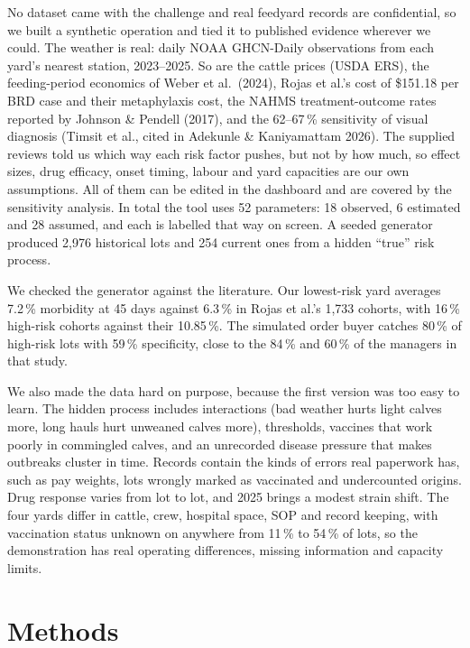 \documentclass[10pt,letterpaper]{article}
\newcommand{\pct}{\,\%}
\newcommand{\usd}[1]{\$#1}
\begin{document}
No dataset came with the challenge and real feedyard records are confidential, so we built a synthetic operation and tied it to published evidence wherever we could. The weather is real: daily NOAA GHCN-Daily observations from each yard's nearest station, 2023--2025. So are the cattle prices (USDA ERS), the feeding-period economics of Weber et al.\ (2024), Rojas et al.'s cost of \usd{151.18} per BRD case and their metaphylaxis cost, the NAHMS treatment-outcome rates reported by Johnson \& Pendell (2017), and the 62--67\pct{} sensitivity of visual diagnosis (Timsit et al., cited in Adekunle \& Kaniyamattam 2026). The supplied reviews told us which way each risk factor pushes, but not by how much, so effect sizes, drug efficacy, onset timing, labour and yard capacities are our own assumptions. All of them can be edited in the dashboard and are covered by the sensitivity analysis. In total the tool uses 52 parameters: 18 observed, 6 estimated and 28 assumed, and each is labelled that way on screen. A seeded generator produced 2,976 historical lots and 254 current ones from a hidden ``true'' risk process.

We checked the generator against the literature. Our lowest-risk yard averages 7.2\pct{} morbidity at 45 days against 6.3\pct{} in Rojas et al.'s 1,733 cohorts, with 16\pct{} high-risk cohorts against their 10.85\pct. The simulated order buyer catches 80\pct{} of high-risk lots with 59\pct{} specificity, close to the 84\pct{} and 60\pct{} of the managers in that study.

We also made the data hard on purpose, because the first version was too easy to learn. The hidden process includes interactions (bad weather hurts light calves more, long hauls hurt unweaned calves more), thresholds, vaccines that work poorly in commingled calves, and an unrecorded disease pressure that makes outbreaks cluster in time. Records contain the kinds of errors real paperwork has, such as pay weights, lots wrongly marked as vaccinated and undercounted origins. Drug response varies from lot to lot, and 2025 brings a modest strain shift. The four yards differ in cattle, crew, hospital space, SOP and record keeping, with vaccination status unknown on anywhere from 11\pct{} to 54\pct{} of lots, so the demonstration has real operating differences, missing information and capacity limits.

\section{Methods}
\end{document}

